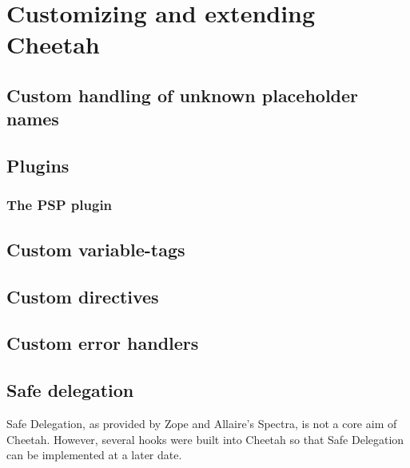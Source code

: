 \section{Customizing and extending Cheetah}
\label{customizing}

\subsection{Custom handling of unknown placeholder names}

\subsection{Plugins}
\subsubsection{The PSP plugin}

\subsection{Custom variable-tags}

\subsection{Custom directives}

\subsection{Custom error handlers}

\subsection{Safe delegation}
Safe Delegation, as provided by Zope and Allaire's Spectra, is not a core aim of
Cheetah.  However, several hooks were built into Cheetah so that Safe
Delegation can be implemented at a later date.


